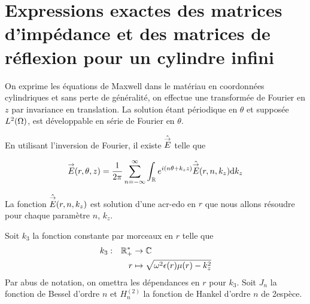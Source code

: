 \section{Expressions exactes des matrices d'impédance et des matrices de réflexion pour un cylindre infini}


  \begin{figure}[!hbt]
    \centering
    \begin{tikzpicture}
      
    \end{tikzpicture}
  \end{figure}

  On exprime les équations de Maxwell dans le matériau en coordonnées cylindriques et sans perte de généralité, on effectue une transformée de Fourier en \(z\) par invariance en translation.
  La solution étant périodique en \(\theta\) et supposée \(L^2(\OO)\), est développable en série de Fourier en \(\theta\).

  En utilisant l'inversion de Fourier, il existe \(\hat\vE\) telle que

  \begin{equation}
    \vE(r,\theta,z) = \frac{1}{2\pi}\sum_{n=-\infty}^{\infty}\int_{\RR} e^{i(n \theta + k_z z )}\hat{\vE} (r,n,k_z) \dd{k_z}
  \end{equation}

  La fonction \(\hat{\vE} (r,n,k_z)\) est solution d'une \gls{acr-edo} en \(r\) que nous allons résoudre pour chaque paramètre \(n\), \(k_z\).

  \begin{defn}
    Soit \(k_3\) la fonction constante par morceaux en \(r\) telle que
    \begin{equation*}
      \fonction{k_3}{\RR_+^*}{\CC}
      {r}{\sqrt{\w^2\eps(r)\mu(r) - k_z^2}}
    \end{equation*}
    Par abus de notation, on omettra les dépendances en \(r\) pour \(k_3\).
    Soit \(J_n\) la fonction de Bessel d'ordre \(n\) et \(H_n^{(2)}\) la fonction de Hankel d'ordre \(n\) de 2\ieme espèce.
  \end{defn}

